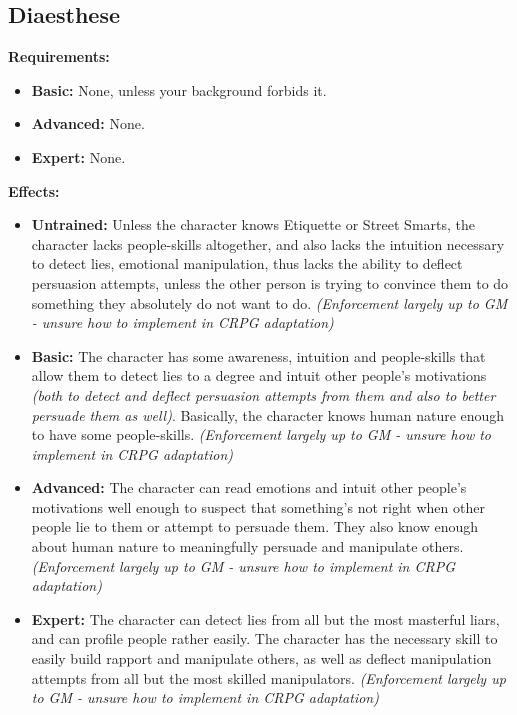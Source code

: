 \subsection{Diaesthese}
\begin{table}[!ht]
\centering
{}
\end{table}
\textbf{Requirements:}
\begin{itemize}
	\item \textbf{Basic:} None, unless your background forbids it.
	\item \textbf{Advanced:} None.
	\item \textbf{Expert:} None.
\end{itemize}
\textbf{Effects:}
\begin{itemize}
	\item \textbf{Untrained:} Unless the character knows Etiquette or Street Smarts, the character lacks people-skills altogether, and also lacks the intuition necessary to detect lies, emotional manipulation, thus lacks the ability to deflect persuasion attempts, unless the other person is trying to convince them to do something they absolutely do not want to do. \textit{(Enforcement largely up to GM - unsure how to implement in CRPG adaptation)}
	\item \textbf{Basic:} The character has some awareness, intuition and people-skills that allow them to detect lies to a degree and intuit other people's motivations \textit{(both to detect and deflect persuasion attempts from them and also to better persuade them as well)}. Basically, the character knows human nature enough to have some people-skills. \textit{(Enforcement largely up to GM - unsure how to implement in CRPG adaptation)}
	\item \textbf{Advanced:} The character can read emotions and intuit other people's motivations well enough to suspect that something's not right when other people lie to them or attempt to persuade them. They also know enough about human nature to meaningfully persuade and manipulate others. \textit{(Enforcement largely up to GM - unsure how to implement in CRPG adaptation)}
	\item \textbf{Expert:} The character can detect lies from all but the most masterful liars, and can profile people rather easily. The character has the necessary skill to easily build rapport and manipulate others, as well as deflect manipulation attempts from all but the most skilled manipulators. \textit{(Enforcement largely up to GM - unsure how to implement in CRPG adaptation)}
\end{itemize}\newpage

